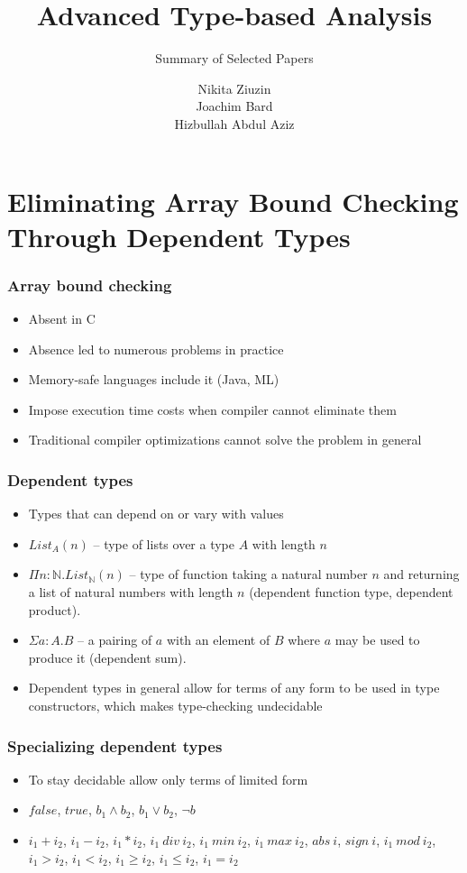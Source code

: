 \documentclass[pdf]{beamer}
\title{Advanced Type-based Analysis}
\subtitle{Summary of Selected Papers}
\author{Nikita Ziuzin \\
        Joachim Bard \\
        Hizbullah Abdul Aziz}
\begin{document}
\begin{frame}
  \titlepage
\end{frame}

\section{Eliminating Array Bound Checking Through Dependent Types}

\begin{frame}
  \frametitle{Array bound checking}

  \begin{itemize}
    \item Absent in C
    \item Absence led to numerous problems in practice
    \item Memory-safe languages include it (Java, ML)
    \item Impose execution time costs when compiler cannot eliminate them
    \item Traditional compiler optimizations cannot solve the problem in general
  \end{itemize}
\end{frame}

\begin{frame}
  \frametitle{Dependent types}

  \begin{itemize}
    \item Types that can depend on or vary with values
    \item $\mathit{List_A}(n)$ -- type of lists over a type $A$ with length $n$
    \item $\Pi n : \mathbb{N}.List_\mathbb{N}(n)$ -- type of function taking a
      natural number $n$ and returning a list of natural numbers with length
      $n$ (dependent function type, dependent product).
    \item $\Sigma a : A. B$ -- a pairing of $a$ with an element of $B$ where $a$
      may be used to produce it (dependent sum).
    \item Dependent types in general allow for terms of any form to be used in
      type constructors, which makes type-checking undecidable
  \end{itemize}
\end{frame}

\begin{frame}
  \frametitle{Specializing dependent types}

  \begin{itemize}
    \item To stay decidable allow only terms of limited form
    \item $false$, $true$, $b_1 \land b_2$, $b_1 \lor b_2$, $\neg b$
    \item $i_1 + i_2$, $i_1 - i_2$, $i_1 * i_2$, $i_1~div~i_2$, $i_1~min~i_2$,
      $i_1~max~i_2$, $abs~i$, $sign~i$, $i_1~mod~i_2$, $i_1 > i_2$, $i_1 <
      i_2$, $i_1 \ge i_2$, $i_1 \le i_2$, $i_1 = i_2$
  \end{itemize}
\end{frame}
\end{document}
